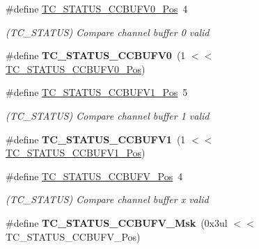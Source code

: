 \begin{DoxyCompactItemize}
\item 
\hypertarget{group___s_a_m_l21___t_c_gac1dc47a3601adc16f9d0ec650aedd5f4}{}\#define \hyperlink{group___s_a_m_l21___t_c_gac1dc47a3601adc16f9d0ec650aedd5f4}{T\+C\+\_\+\+S\+T\+A\+T\+U\+S\+\_\+\+C\+C\+B\+U\+F\+V0\+\_\+\+Pos}~4\label{group___s_a_m_l21___t_c_gac1dc47a3601adc16f9d0ec650aedd5f4}

\begin{DoxyCompactList}\small\item\em (T\+C\+\_\+\+S\+T\+A\+T\+U\+S) Compare channel buffer 0 valid \end{DoxyCompactList}\item 
\hypertarget{group___s_a_m_l21___t_c_gac304c8badb4d53819ade4ed7daf04ec7}{}\#define {\bfseries T\+C\+\_\+\+S\+T\+A\+T\+U\+S\+\_\+\+C\+C\+B\+U\+F\+V0}~(1 $<$$<$ \hyperlink{group___s_a_m_l21___t_c_gac1dc47a3601adc16f9d0ec650aedd5f4}{T\+C\+\_\+\+S\+T\+A\+T\+U\+S\+\_\+\+C\+C\+B\+U\+F\+V0\+\_\+\+Pos})\label{group___s_a_m_l21___t_c_gac304c8badb4d53819ade4ed7daf04ec7}

\item 
\hypertarget{group___s_a_m_l21___t_c_gaf766caab16695a221ebbca992320b3b0}{}\#define \hyperlink{group___s_a_m_l21___t_c_gaf766caab16695a221ebbca992320b3b0}{T\+C\+\_\+\+S\+T\+A\+T\+U\+S\+\_\+\+C\+C\+B\+U\+F\+V1\+\_\+\+Pos}~5\label{group___s_a_m_l21___t_c_gaf766caab16695a221ebbca992320b3b0}

\begin{DoxyCompactList}\small\item\em (T\+C\+\_\+\+S\+T\+A\+T\+U\+S) Compare channel buffer 1 valid \end{DoxyCompactList}\item 
\hypertarget{group___s_a_m_l21___t_c_ga8a1cae9ab002e2a9e55dcc2b8ecc3e8c}{}\#define {\bfseries T\+C\+\_\+\+S\+T\+A\+T\+U\+S\+\_\+\+C\+C\+B\+U\+F\+V1}~(1 $<$$<$ \hyperlink{group___s_a_m_l21___t_c_gaf766caab16695a221ebbca992320b3b0}{T\+C\+\_\+\+S\+T\+A\+T\+U\+S\+\_\+\+C\+C\+B\+U\+F\+V1\+\_\+\+Pos})\label{group___s_a_m_l21___t_c_ga8a1cae9ab002e2a9e55dcc2b8ecc3e8c}

\item 
\hypertarget{group___s_a_m_l21___t_c_ga64c356b782a746f7696fd5c098bddb7f}{}\#define \hyperlink{group___s_a_m_l21___t_c_ga64c356b782a746f7696fd5c098bddb7f}{T\+C\+\_\+\+S\+T\+A\+T\+U\+S\+\_\+\+C\+C\+B\+U\+F\+V\+\_\+\+Pos}~4\label{group___s_a_m_l21___t_c_ga64c356b782a746f7696fd5c098bddb7f}

\begin{DoxyCompactList}\small\item\em (T\+C\+\_\+\+S\+T\+A\+T\+U\+S) Compare channel buffer x valid \end{DoxyCompactList}\item 
\hypertarget{group___s_a_m_l21___t_c_ga8aceee2a54291465a8a6a0678d56f510}{}\#define {\bfseries T\+C\+\_\+\+S\+T\+A\+T\+U\+S\+\_\+\+C\+C\+B\+U\+F\+V\+\_\+\+Msk}~(0x3ul $<$$<$ T\+C\+\_\+\+S\+T\+A\+T\+U\+S\+\_\+\+C\+C\+B\+U\+F\+V\+\_\+\+Pos)\label{group___s_a_m_l21___t_c_ga8aceee2a54291465a8a6a0678d56f510}


\end{DoxyCompactItemize}
